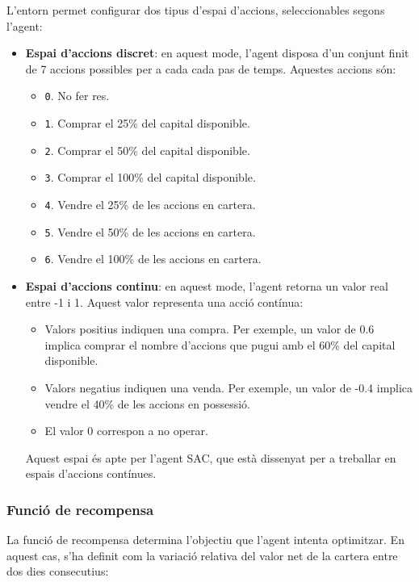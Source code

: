 \documentclass[12pt,a4paper,twoside]{book}
\begin{document}
L'entorn permet configurar dos tipus d'espai d'accions, seleccionables segons l'agent:
\begin{itemize}
    \item \textbf{Espai d'accions discret}: en aquest mode, l'agent disposa d'un conjunt finit de 7 accions possibles per a cada cada pas de temps. Aquestes accions són:
    \begin{itemize}
        \item \texttt{0}. No fer res.
        \item \texttt{1}. Comprar el 25\% del capital disponible.
        \item \texttt{2}. Comprar el 50\% del capital disponible.
        \item \texttt{3}. Comprar el 100\% del capital disponible.
        \item \texttt{4}. Vendre el 25\% de les accions en cartera.
        \item \texttt{5}. Vendre el 50\% de les accions en cartera.
        \item \texttt{6}. Vendre el 100\% de les accions en cartera.
    \end{itemize}

    \item \textbf{Espai d'accions continu}: en aquest mode, l'agent retorna un valor real entre -1 i 1. Aquest valor representa una acció contínua:
    \begin{itemize}
        \item Valors positius indiquen una compra. Per exemple, un valor de 0.6 implica comprar el nombre d'accions que pugui amb el 60\% del capital disponible.
        \item Valors negatius indiquen una venda. Per exemple, un valor de -0.4 implica vendre el 40\% de les accions en possessió.
        \item El valor 0 correspon a no operar.
    \end{itemize}
    Aquest espai és apte per l'agent SAC, que està dissenyat per a treballar en espais d'accions contínues.
\end{itemize}

\subsubsection{Funció de recompensa}

La funció de recompensa determina l'objectiu que l'agent intenta optimitzar. En aquest cas, s'ha definit com la variació relativa del valor net de la cartera entre dos dies consecutius:
\end{document}
